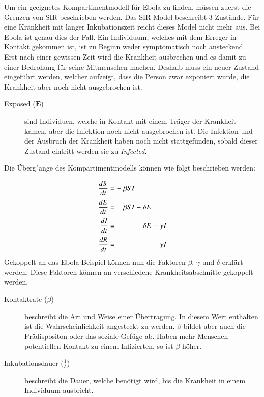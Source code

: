 \begin{refsection}
Um ein geeignetes Kompartimentmodell für Ebola zu finden, müssen zuerst die Grenzen von SIR beschrieben werden.
Das SIR Model beschreibt 3 Zustände. 
Für eine Krankheit mit langer Inkubationszeit reicht dieses Model nicht mehr aus. 
Bei Ebola ist genau dies der Fall.
Ein Individuum, welches mit dem Erreger in Kontakt gekommen ist, ist zu Beginn weder symptomatisch noch ansteckend. 
Erst nach einer gewissen Zeit wird die Krankheit ausbrechen und es damit zu einer Bedrohung für seine Mitmenschen machen. 
Deshalb muss ein neuer Zustand eingeführt werden, welcher aufzeigt, dass die Person zwar exponiert wurde, die Krankheit aber noch nicht ausgebrochen ist.
\begin{figure}[ht]
  \centering
  
\end{figure}
\begin{description}
  \item [Exposed ($\mathbf{E}$)] sind Individuen, welche in Kontakt mit einem Träger der Krankheit kamen, aber die Infektion noch nicht ausgebrochen ist. Die Infektion und der Ausbruch der Krankheit haben noch nicht stattgefunden, sobald dieser Zustand eintritt werden sie zu \emph{Infected}.
\end{description}
Die Überg"ange des Kompartimentmodells können wie folgt beschrieben werden:
\[
\arraycolsep=1.4pt\def\arraystretch{2.2}
  \begin{array}{rccrcrcr}
   \displaystyle\frac{dS}{dt} & = &-&\beta S I& &        & &        \\
   \displaystyle\frac{dE}{dt} & = & &\beta S I&-&\delta E& &        \\
   \displaystyle\frac{dI}{dt} & = & &         & &\delta E&-&\gamma I\\
   \displaystyle\frac{dR}{dt} & = & &         & &        & &\gamma I
 \end{array}
\]
Gekoppelt an das Ebola Beispiel können nun die Faktoren $\beta$, $\gamma$ und $\delta$ erklärt werden. Diese Faktoren können an verschiedene Krankheitsabschnitte gekoppelt werden.
\begin{description}
  \item [Kontaktrate ($\beta$)] beschreibt die Art und Weise einer Übertragung. In diesem Wert enthalten ist die Wahrscheinlichkeit angesteckt zu werden. $\beta$ bildet aber auch die Prädispositon oder das soziale Gefüge ab. Haben mehr Menschen potentiellen Kontakt zu einem Infizierten, so ist $\beta$ höher.
  \item [Inkubationsdauer ($\frac{1}{\delta}$)] beschreibt die Dauer, welche benötigt wird, bis die Krankheit in einem Individuum ausbricht.

\end{description}
\end{refsection}
